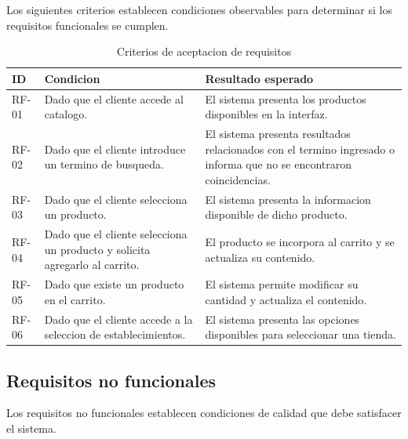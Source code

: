 \documentclass[11pt,a4paper]{article}
\begin{document}
Los siguientes criterios establecen condiciones
observables para determinar si los requisitos
funcionales se cumplen.

\begin{table}[H]
\centering
\caption{Criterios de aceptacion de requisitos}
\small
\begin{tabularx}{\textwidth}{p{2cm}YY}
\toprule
\textbf{ID} &
\textbf{Condicion} &
\textbf{Resultado esperado} \\
\midrule

RF-01 &
Dado que el cliente accede al catalogo. &
El sistema presenta los productos disponibles
en la interfaz. \\

RF-02 &
Dado que el cliente introduce un termino
de busqueda. &
El sistema presenta resultados relacionados
con el termino ingresado o informa que no
se encontraron coincidencias. \\

RF-03 &
Dado que el cliente selecciona un producto. &
El sistema presenta la informacion disponible
de dicho producto. \\

RF-04 &
Dado que el cliente selecciona un producto
y solicita agregarlo al carrito. &
El producto se incorpora al carrito y se
actualiza su contenido. \\

RF-05 &
Dado que existe un producto en el carrito. &
El sistema permite modificar su cantidad
y actualiza el contenido. \\

RF-06 &
Dado que el cliente accede a la seleccion
de establecimientos. &
El sistema presenta las opciones disponibles
para seleccionar una tienda. \\

\bottomrule
\end{tabularx}
\end{table}

\subsection{Requisitos no funcionales}

Los requisitos no funcionales establecen condiciones
de calidad que debe satisfacer el sistema.
\end{document}
